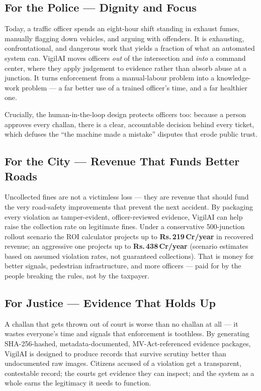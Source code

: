 \documentclass[11pt,a4paper]{article}
\begin{document}
\subsection{For the Police — Dignity and Focus}

Today, a traffic officer spends an eight-hour shift standing in exhaust fumes, manually flagging down vehicles, and arguing with offenders. It is exhausting, confrontational, and dangerous work that yields a fraction of what an automated system can. VigilAI moves officers \emph{out} of the intersection and \emph{into} a command center, where they apply judgement to evidence rather than absorb abuse at a junction. It turns enforcement from a manual-labour problem into a knowledge-work problem — a far better use of a trained officer's time, and a far healthier one.

Crucially, the human-in-the-loop design protects officers too: because a person approves every challan, there is a clear, accountable decision behind every ticket, which defuses the ``the machine made a mistake'' disputes that erode public trust.

\subsection{For the City — Revenue That Funds Better Roads}

Uncollected fines are not a victimless loss — they are revenue that should fund the very road-safety improvements that prevent the next accident. By packaging every violation as tamper-evident, officer-reviewed evidence, VigilAI can help raise the collection rate on legitimate fines. Under a conservative 500-junction rollout scenario the ROI calculator projects up to \textbf{Rs.\,219\,Cr/year} in recovered revenue; an aggressive one projects up to \textbf{Rs.\,438\,Cr/year} (scenario estimates based on assumed violation rates, not guaranteed collections). That is money for better signals, pedestrian infrastructure, and more officers — paid for by the people breaking the rules, not by the taxpayer.

\subsection{For Justice — Evidence That Holds Up}

A challan that gets thrown out of court is worse than no challan at all — it wastes everyone's time and signals that enforcement is toothless. By generating SHA-256-hashed, metadata-documented, MV-Act-referenced evidence packages, VigilAI is designed to produce records that survive scrutiny better than undocumented raw images. Citizens accused of a violation get a transparent, contestable record; the courts get evidence they can inspect; and the system as a whole earns the legitimacy it needs to function.
\end{document}
